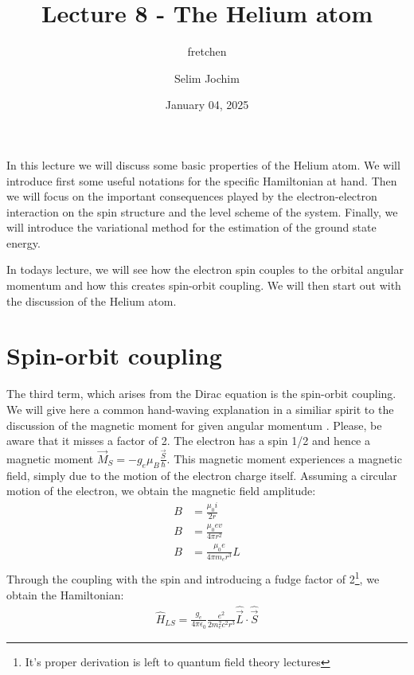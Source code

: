\documentclass[10pt]{article}
\let\cite\citep
\renewenvironment{abstract}
  {{\bfseries\noindent{\abstractname}\par\nobreak}\footnotesize}
  {\bigskip}
\providecommand\citep{\cite}
\begin{document}
\title{Lecture 8 - The Helium atom}



\author[1]{fretchen}%
\author[2]{Selim Jochim}%
%
%


\vspace{-1em}



  
  \date{January 04, 2025}


\begingroup
\let\center\flushleft
\let\endcenter\endflushleft
\maketitle
\endgroup





\begin{abstract}
In this lecture we will discuss some basic properties of the Helium atom. We will introduce first some useful notations for the specific Hamiltonian at hand. Then we will focus on the important consequences played by the electron-electron interaction on the spin structure and the level scheme of the system. Finally, we will introduce the variational method for the estimation of the ground state energy.%
\end{abstract}%



\sloppy


In todays lecture, we will see how the electron spin couples to the orbital angular momentum and how this creates spin-orbit coupling. We will then start out with the discussion of the Helium atom.

\section{Spin-orbit coupling}

The third term, which arises from the Dirac equation is the spin-orbit coupling. We will give here a common hand-waving explanation in a similiar spirit to the discussion of the magnetic moment for given angular momentum \cite{Demtr_der_2010}. Please, be aware that it misses a factor of 2. The electron has a spin 1/2 and hence a magnetic moment $\vec{M}_S = -g_e \mu_B \frac{\vec{S}}{\hbar}$. This magnetic moment experiences a magnetic field, simply due to the motion of the electron charge itself. Assuming a circular motion of the electron, we obtain the magnetic field amplitude:
\begin{align}
B &= \frac{\mu_0 i}{2r}\\
B &= \frac{\mu_0 ev}{4\pi r^2}\\
B &= \frac{\mu_0 e}{4\pi m_e r^3}L\\
\end{align}
Through the coupling with the spin and introducing a fudge factor of 2\footnote{It's proper derivation is left to quantum field theory lectures}, we obtain the Hamiltonian:
\begin{align}\label{Eq:HamLS}
\hat{H}_{LS} = \frac{g_e}{4\pi \epsilon_0}\frac{e^2}{2m_e^2c^2 r^3}  \hat{\vec{L}}\cdot \hat{\vec{S}}
\end{align}
\end{document}
